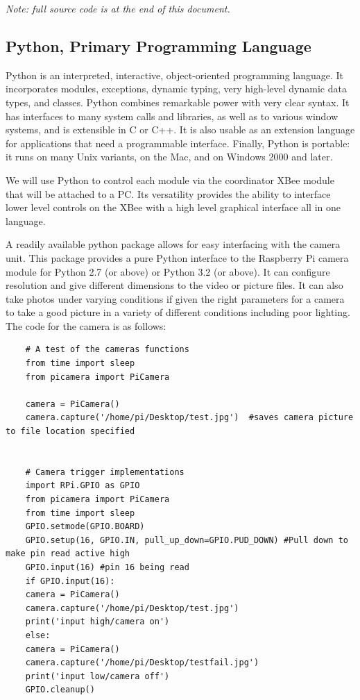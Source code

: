 	\textit{\small Note: full source code is at the end of this document.}
	\subsection{Python, Primary Programming Language}
	
	\par Python is an interpreted, interactive, object-oriented programming language. It incorporates modules, exceptions, dynamic typing, very high-level dynamic data types, and classes. Python combines remarkable power with very clear syntax. It has interfaces to many system calls and libraries, as well as to various window systems, and is extensible in C or C++. It is also usable as an extension language for applications that need a programmable interface. Finally, Python is portable: it runs on many Unix variants, on the Mac, and on Windows 2000 and later.
	\par We will use Python to control each module via the coordinator XBee module that will be attached to a PC. Its versatility provides the ability to interface lower level controls on the XBee with a high level graphical interface all in one language. 
	\par A readily available python package allows for easy interfacing with the camera unit. This package provides a pure Python interface to the Raspberry Pi camera module for Python 2.7 (or above) or Python 3.2 (or above). It can configure resolution and give different dimensions to the video or picture files. It can also take photos under varying conditions if given the right parameters for a camera to take a good picture in a variety of different conditions including poor lighting. 
	The code for the camera is as follows:
	\begin{lstlisting}
	# A test of the cameras functions
	from time import sleep
	from picamera import PiCamera
	
	camera = PiCamera()
	camera.capture('/home/pi/Desktop/test.jpg')  #saves camera picture to file location specified
	
	
	# Camera trigger implementations
	import RPi.GPIO as GPIO
	from picamera import PiCamera
	from time import sleep
	GPIO.setmode(GPIO.BOARD)
	GPIO.setup(16, GPIO.IN, pull_up_down=GPIO.PUD_DOWN) #Pull down to make pin read active high
	GPIO.input(16) #pin 16 being read
	if GPIO.input(16):
	camera = PiCamera()
	camera.capture('/home/pi/Desktop/test.jpg')
	print('input high/camera on')
	else:
	camera = PiCamera()
	camera.capture('/home/pi/Desktop/testfail.jpg')
	print('input low/camera off')
	GPIO.cleanup()
	\end{lstlisting}
